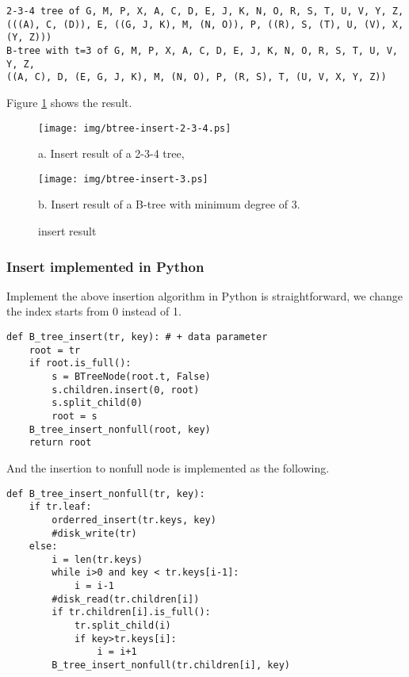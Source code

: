 \documentclass{article}
\begin{document}
\begin{verbatim}
2-3-4 tree of G, M, P, X, A, C, D, E, J, K, N, O, R, S, T, U, V, Y, Z, 
(((A), C, (D)), E, ((G, J, K), M, (N, O)), P, ((R), S, (T), U, (V), X, (Y, Z)))
B-tree with t=3 of G, M, P, X, A, C, D, E, J, K, N, O, R, S, T, U, V, Y, Z, 
((A, C), D, (E, G, J, K), M, (N, O), P, (R, S), T, (U, V, X, Y, Z))
\end{verbatim}

Figure \ref{fig:btree-insert} shows the result.

\begin{figure}[htbp]
  \begin{center}
    \texttt{[image: img/btree-insert-2-3-4.ps]}

    a. Insert result of a 2-3-4 tree,

    \texttt{[image: img/btree-insert-3.ps]}

    b. Insert result of a B-tree with minimum degree of 3. 
    \caption{insert result} \label{fig:btree-insert}
  \end{center}
\end{figure}

\subsubsection*{Insert implemented in Python}
Implement the above insertion algorithm in Python is straightforward, we change
the index starts from 0 instead of 1.

\lstset{language=Python}
\begin{lstlisting}
def B_tree_insert(tr, key): # + data parameter
    root = tr
    if root.is_full():
        s = BTreeNode(root.t, False)
        s.children.insert(0, root)
        s.split_child(0)
        root = s
    B_tree_insert_nonfull(root, key)
    return root
\end{lstlisting}

And the insertion to nonfull node is implemented as the following.

\begin{lstlisting}
def B_tree_insert_nonfull(tr, key):
    if tr.leaf:
        orderred_insert(tr.keys, key)
        #disk_write(tr)
    else:
        i = len(tr.keys)
        while i>0 and key < tr.keys[i-1]:
            i = i-1
        #disk_read(tr.children[i])
        if tr.children[i].is_full():
            tr.split_child(i)
            if key>tr.keys[i]:
                i = i+1
        B_tree_insert_nonfull(tr.children[i], key)
\end{lstlisting}
\end{document}
